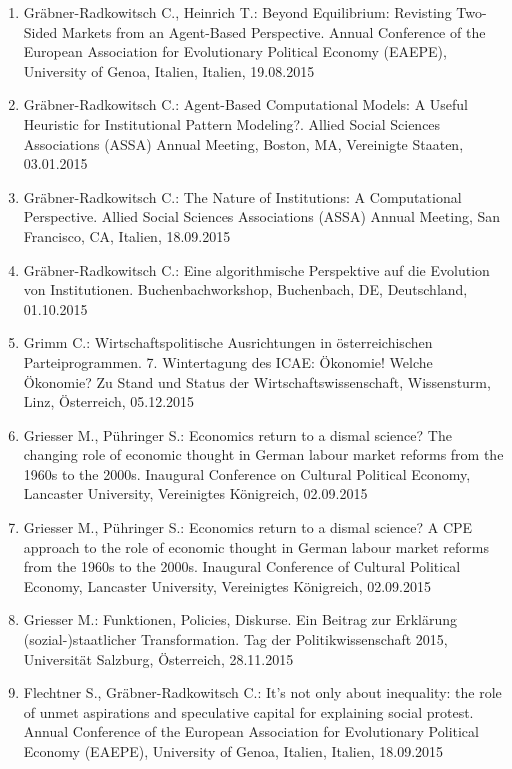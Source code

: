\begin{enumerate}
	\item Gräbner-Radkowitsch C., Heinrich T.: Beyond Equilibrium: Revisting Two-Sided Markets from an Agent-Based Perspective. Annual Conference of the European Association for Evolutionary Political Economy (EAEPE), University of Genoa, Italien, Italien, 19.08.2015
	\item Gräbner-Radkowitsch C.: Agent-Based Computational Models: A Useful Heuristic for Institutional Pattern Modeling?. Allied Social Sciences Associations (ASSA) Annual Meeting, Boston, MA, Vereinigte Staaten, 03.01.2015
	\item Gräbner-Radkowitsch C.: The Nature of Institutions: A Computational Perspective. Allied Social Sciences Associations (ASSA) Annual Meeting, San Francisco, CA, Italien, 18.09.2015
	\item Gräbner-Radkowitsch C.: Eine algorithmische Perspektive auf die Evolution von Institutionen. Buchenbachworkshop, Buchenbach, DE, Deutschland, 01.10.2015
	\item Grimm C.: Wirtschaftspolitische Ausrichtungen in österreichischen Parteiprogrammen. 7. Wintertagung des ICAE: Ökonomie! Welche Ökonomie? Zu Stand und Status der Wirtschaftswissenschaft, Wissensturm, Linz, Österreich, 05.12.2015
	\item Griesser M., Pühringer S.: Economics return to a dismal science? The changing role of economic thought in German labour market reforms from the 1960s to the 2000s. Inaugural Conference on Cultural Political Economy, Lancaster University, Vereinigtes Königreich, 02.09.2015
	\item Griesser M., Pühringer S.: Economics return to a dismal science? A CPE approach to the role of economic thought in German labour market reforms from the 1960s to the 2000s. Inaugural Conference of Cultural Political Economy, Lancaster University, Vereinigtes Königreich, 02.09.2015
	\item Griesser M.: Funktionen, Policies, Diskurse. Ein Beitrag zur Erklärung (sozial-)staatlicher Transformation. Tag der Politikwissenschaft 2015, Universität Salzburg, Österreich, 28.11.2015
	\item Flechtner S., Gräbner-Radkowitsch C.: It’s not only about inequality: the role of unmet aspirations and speculative capital for explaining social protest. Annual Conference of the European Association for Evolutionary Political Economy (EAEPE), University of Genoa, Italien, Italien, 18.09.2015
\end{enumerate}
